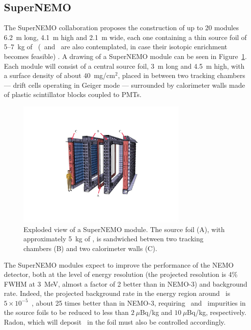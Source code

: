 \documentclass{PoS}
\begin{document}
\subsection{SuperNEMO} \label{subsec:SuperNEMO}
The SuperNEMO collaboration proposes the construction of up to 20 modules 6.2~m long, 4.1~m high and 2.1~m wide, each one containing a thin source foil of 5--7~kg of \SE\ (\ND\ and \CA\ are also contemplated, in case their isotopic enrichment becomes feasible) \cite{Lang:2013fta}. A drawing of a SuperNEMO module can be seen in Figure~\ref{fig:SuperNEMO}. Each module will consist of a central source foil, 3~m long and 4.5~m high, with a surface density of about 40~mg/cm$^{2}$, placed in between two tracking chambers --- drift cells operating in Geiger mode --- surrounded by calorimeter walls made of plastic scintillator blocks coupled to PMTs.

\begin{figure}
\centering
\includegraphics[trim=220 155 220 155, clip, width=0.75\textwidth]{img/SuperNEMO.pdf}
\caption{Exploded view of a SuperNEMO module. The source foil (A), with approximately 5~kg of \SE, is sandwiched between two tracking chambers (B) and two calorimeter walls (C).} \label{fig:SuperNEMO}
\end{figure}

The SuperNEMO modules expect to improve the performance of the NEMO detector, both at the level of energy resolution (the projected resolution is 4\% FWHM at 3~MeV, almost a factor of 2 better than in NEMO-3) and background rate. Indeed, the 
projected background rate in the energy region around \Qbb\ is $5\times10^{-5}$~\ckky, about 25 times better than in NEMO-3, requiring \BI\ and \TL\ impurities in the source foils to be reduced to less than $2~\mu$Bq/kg and $10~\mu$Bq/kg, respectively. Radon, which will deposit \BI\ in the foil must also be controlled accordingly. 
\end{document}
